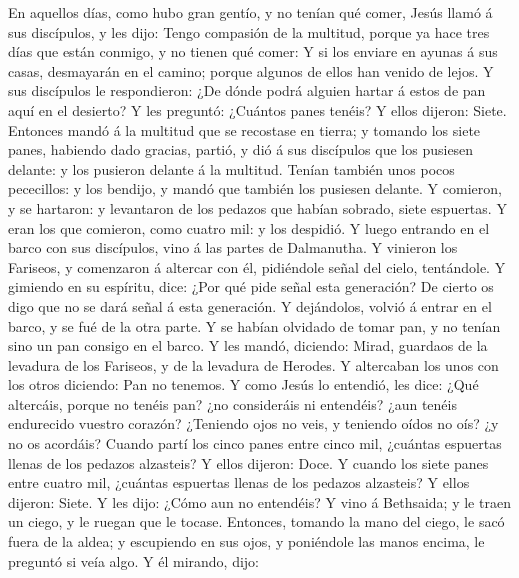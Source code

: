  En aquellos días, como hubo gran gentío, y no tenían qué
comer, Jesús llamó á sus discípulos, y les dijo:  Tengo
compasión de la multitud, porque ya hace tres días que están conmigo, y
no tienen qué comer:  Y si los enviare en ayunas á sus
casas, desmayarán en el camino; porque algunos de ellos han venido de
lejos.  Y sus discípulos le respondieron: ¿De dónde podrá
alguien hartar á estos de pan aquí en el desierto?  Y les
preguntó: ¿Cuántos panes tenéis? Y ellos dijeron: Siete. 
Entonces mandó á la multitud que se recostase en tierra; y tomando los
siete panes, habiendo dado gracias, partió, y dió á sus discípulos que
los pusiesen delante: y los pusieron delante á la multitud.
 Tenían también unos pocos pececillos: y los bendijo, y
mandó que también los pusiesen delante.  Y comieron, y se
hartaron: y levantaron de los pedazos que habían sobrado, siete
espuertas.  Y eran los que comieron, como cuatro mil: y
los despidió.  Y luego entrando en el barco con sus
discípulos, vino á las partes de Dalmanutha.  Y vinieron
los Fariseos, y comenzaron á altercar con él, pidiéndole señal del
cielo, tentándole.  Y gimiendo en su espíritu, dice: ¿Por
qué pide señal esta generación? De cierto os digo que no se dará señal á
esta generación.  Y dejándolos, volvió á entrar en el
barco, y se fué de la otra parte.  Y se habían olvidado
de tomar pan, y no tenían sino un pan consigo en el barco.
 Y les mandó, diciendo: Mirad, guardaos de la levadura de
los Fariseos, y de la levadura de Herodes.  Y altercaban
los unos con los otros diciendo: Pan no tenemos.  Y como
Jesús lo entendió, les dice: ¿Qué altercáis, porque no tenéis pan? ¿no
consideráis ni entendéis? ¿aun tenéis endurecido vuestro corazón?
 ¿Teniendo ojos no veis, y teniendo oídos no oís? ¿y no
os acordáis?  Cuando partí los cinco panes entre cinco
mil, ¿cuántas espuertas llenas de los pedazos alzasteis? Y ellos
dijeron: Doce.  Y cuando los siete panes entre cuatro
mil, ¿cuántas espuertas llenas de los pedazos alzasteis? Y ellos
dijeron: Siete.  Y les dijo: ¿Cómo aun no entendéis?
 Y vino á Bethsaida; y le traen un ciego, y le ruegan que
le tocase.  Entonces, tomando la mano del ciego, le sacó
fuera de la aldea; y escupiendo en sus ojos, y poniéndole las manos
encima, le preguntó si veía algo.  Y él mirando, dijo:
